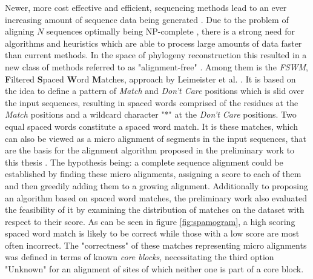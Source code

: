 Newer, more cost effective and efficient, sequencing methods lead to an ever increasing amount of sequence data being generated \cite{muir2016real}. Due to the problem of aligning $N$ sequences optimally being NP-complete \cite{Russell2016}, there is a strong need for algorithms and heuristics which are able to process large amounts of data faster than current methods. In the space of phylogeny reconstruction this resulted in a new class of methods referred to as "alignment-free" \cite{leimeister2014fast, leimeister2017fast, leimeister2018accurate}. Among them is the \textit{FSWM}, \textbf{F}iltered \textbf{S}paced \textbf{W}ord \textbf{M}atches, approach by Leimeister et al. \cite{leimeister2014fast}. It is based on the idea to define a pattern of \textit{Match} and \textit{Don't Care} positions which is slid over the input sequences, resulting in spaced words comprised of the residues at the \textit{Match} positions and a wildcard character "*" at the \textit{Don't Care} positions. Two equal spaced words constitute a spaced word match. It is these matches, which can also be viewed as a micro alignment of segments in the input sequences, that are the basis for the alignment algorithm proposed in the preliminary work to this thesis \cite{hundt2020praktkium}. The hypothesis being: a complete sequence alignment could be established by finding these micro alignments, assigning a score to each of them and then greedily adding them to a growing alignment. Additionally to proposing an algorithm based on spaced word matches, the preliminary work also evaluated the feasibility of it by examining the distribution of matches on the \bb dataset with respect to their score. As can be seen in figure \ref{fig:spamogram}, a high scoring spaced word match is likely to be correct while those with a low score are most often incorrect. The "correctness" of these matches representing micro alignments was defined in terms of known \textit{core blocks}, necessitating the third option "Unknown" for an alignment of sites of which neither one is part of a core block.



